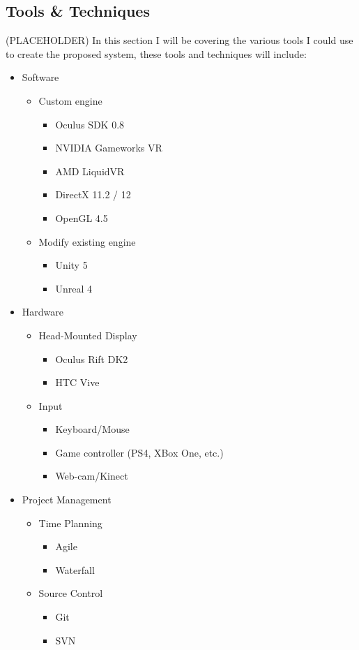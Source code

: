 	\subsection{Tools \& Techniques}
	\label{lr:cross:tools}
		(PLACEHOLDER) In this section I will be covering the various tools I could use to create the proposed system, these tools and techniques will include:
		\begin{itemize}
			\item Software 
			\begin{itemize}
				\item Custom engine
				\begin{itemize}
					\item Oculus SDK 0.8
					\item NVIDIA Gameworks VR
					\item AMD LiquidVR
					\item DirectX 11.2 / 12
					\item OpenGL 4.5
				\end{itemize}
				\item Modify existing engine
				\begin{itemize}
					\item Unity 5
					\item Unreal 4
				\end{itemize}
			\end{itemize}
			\item Hardware
			\begin{itemize}
				\item Head-Mounted Display
				\begin{itemize}
					\item Oculus Rift DK2
					\item HTC Vive
				\end{itemize}
				\item Input
				\begin{itemize}
					\item Keyboard/Mouse
					\item Game controller (PS4, XBox One, etc.)
					\item Web-cam/Kinect
				\end{itemize}
			\end{itemize}
			\item Project Management
			\begin{itemize}
				\item Time Planning
				\begin{itemize}
					\item Agile
					\item Waterfall
				\end{itemize}
				\item Source Control
				\begin{itemize}
					\item Git
					\item SVN
				\end{itemize}
			\end{itemize}
		\end{itemize}
